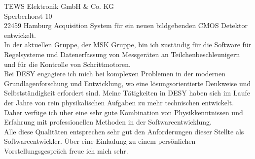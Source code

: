 \documentclass[ebner,paper=a4,fontsize=11pt,ngerman,BCOR=10mm]{scrlttr2}%
\begin{document}
\begin{letter}{TEWS Elektronik GmbH \& Co. KG\\
Sperberhorst 10\\
22459 Hamburg}
Acquisition System f\"ur ein neuen bildgebenden CMOS Detektor entwickelt.\\
In der aktuellen Gruppe, der MSK Gruppe, bin ich zust{\"a}ndig f{\"u}r die
Software f{\"u}r Regelsysteme und Datenerfassung von Messger{\"a}ten an
Teilchenbeschleunigern und f{\"u}r die Kontrolle von Schrittmotoren.\\
\indent Bei DESY engagiere ich mich bei komplexen Problemen in der modernen
Grundlagenforschung und Entwicklung, wo eine l{\"o}sungsorientierte Denkweise
und Selbstst\"andigkeit erfordert sind. Meine T{\"a}tigkeiten in DESY haben sich
im Laufe der Jahre von rein physikalischen Aufgaben zu mehr technischen
entwickelt. Daher verf{\"u}ge ich {\"u}ber eine sehr gute Kombination von
Physikkenntnissen und Erfahrung mit professionellen Methoden in der
Softwareentwicklung.\\
\indent Alle diese Qualit{\"a}ten entsprechen sehr gut den Anforderungen
dieser Stellte als Softwareentwickler. \"Uber eine Einladung zu
einem pers\"onlichen Vorstellungsgespr\"ach freue ich mich sehr.


\end{letter}
\end{document}
